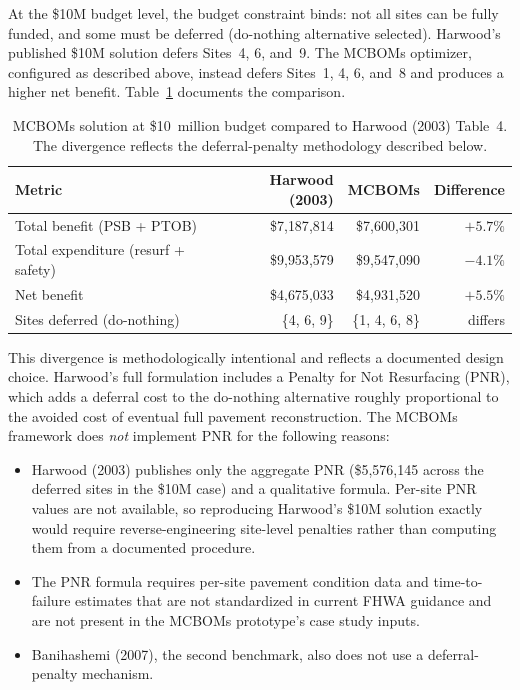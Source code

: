 At the \$10M budget level, the budget constraint binds: not all sites can be
fully funded, and some must be deferred (do-nothing alternative selected).
Harwood's published \$10M solution defers Sites~4, 6, and~9. The MCBOMs
optimizer, configured as described above, instead defers Sites~1, 4, 6,
and~8 and produces a higher net benefit. Table~\ref{tab:harwood-10m}
documents the comparison.

\begin{table}[H]
\centering
\caption{MCBOMs solution at \$10~million budget compared to Harwood (2003)
Table~4. The divergence reflects the deferral-penalty methodology described
below.}
\label{tab:harwood-10m}
\begin{tabular}{lrrr}
\toprule
\textbf{Metric} & \textbf{Harwood (2003)} & \textbf{MCBOMs} & \textbf{Difference} \\
\midrule
Total benefit (PSB + PTOB)             & \$7{,}187{,}814 & \$7{,}600{,}301 & $+5.7\%$ \\
Total expenditure (resurf + safety)    & \$9{,}953{,}579 & \$9{,}547{,}090 & $-4.1\%$ \\
Net benefit                            & \$4{,}675{,}033 & \$4{,}931{,}520 & $+5.5\%$ \\
\midrule
Sites deferred (do-nothing)            & \{4, 6, 9\}     & \{1, 4, 6, 8\}  & differs \\
\bottomrule
\end{tabular}
\end{table}

This divergence is methodologically intentional and reflects a documented
design choice. Harwood's full formulation includes a Penalty for Not
Resurfacing (PNR), which adds a deferral cost to the do-nothing alternative
roughly proportional to the avoided cost of eventual full pavement
reconstruction. The MCBOMs framework does \emph{not} implement PNR for the
following reasons:

\begin{itemize}[leftmargin=2em, itemsep=2pt]
  \item Harwood (2003) publishes only the aggregate PNR (\$5{,}576{,}145
    across the deferred sites in the \$10M case) and a qualitative formula.
    Per-site PNR values are not available, so reproducing Harwood's
    \$10M solution exactly would require reverse-engineering site-level
    penalties rather than computing them from a documented procedure.
  \item The PNR formula requires per-site pavement condition data and
    time-to-failure estimates that are not standardized in current FHWA
    guidance and are not present in the MCBOMs prototype's case study
    inputs.
  \item Banihashemi (2007), the second benchmark, also does not use a
    deferral-penalty mechanism.
\end{itemize}

